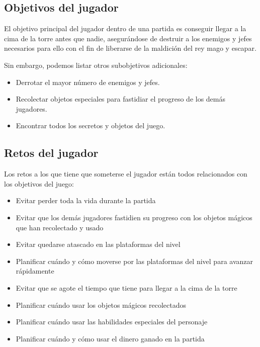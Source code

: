 \subsection{Objetivos del jugador}
El objetivo principal del jugador dentro de una partida es conseguir llegar a la
cima de la torre antes que nadie, asegurándose de destruir a los enemigos y
jefes necesarios para ello con el fin de liberarse de la maldición del rey mago y escapar.

Sin embargo, podemos listar otros subobjetivos adicionales:
\begin{itemize}
    \item Derrotar el mayor número de enemigos y jefes.
    \item Recolectar objetos especiales para fastidiar el progreso de los demás
    jugadores.
    \item Encontrar todos los secretos y objetos del juego.
\end{itemize}

\subsection{Retos del jugador}

Los retos a los que tiene que someterse el jugador están todos relacionados con
los objetivos del juego:
\begin{itemize}
    \item Evitar perder toda la vida durante la partida
    \item Evitar que los demás jugadores fastidien su progreso con los objetos
    mágicos que han recolectado y usado
    \item Evitar quedarse atascado en las plataformas del nivel
    \item Planificar cuándo y cómo moverse por las plataformas del nivel para
    avanzar rápidamente
    \item Evitar que se agote el tiempo que tiene para llegar a la cima de la
    torre
    \item Planificar cuándo usar los objetos mágicos recolectados
    \item Planificar cuándo usar las habilidades especiales del personaje
    \item Planificar cuándo y cómo usar el dinero ganado en la partida
\end{itemize}